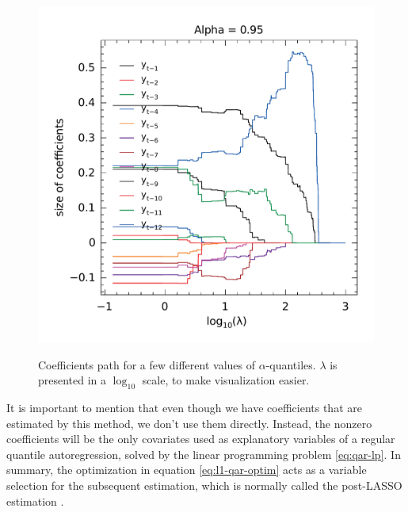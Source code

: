 \begin{figure}
\begin{minipage}[t]{0.4\linewidth}
\begin{minipage}[b]{\linewidth}
		\end{minipage}
		\begin{minipage}[b]{\linewidth}
			\centering     \includegraphics[width=\textwidth]{Figuras/selecao-lasso/par-sellasso-095.pdf}
			\label{fig:npqar-cross}
		\end{minipage}
	\end{minipage}
	\caption{Coefficients path for a few different values of $\alpha$-quantiles. $\lambda$ is presented in a $\log_{10}$ scale, to make visualization easier.}
	\label{fig:npqar-results}
\end{figure}

It is important to mention that even though we have coefficients that are estimated by this method, we don't use them directly. Instead, the nonzero coefficients will be the only covariates used as explanatory variables of a regular quantile autoregression, solved by the linear programming problem \ref{eq:qar-lp}. In summary, the optimization in equation \ref{eq:l1-qar-optim} acts as a variable selection for the subsequent estimation, which is normally called the post-LASSO estimation \cite{belloni2009least}.

